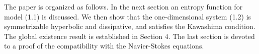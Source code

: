\documentclass{article}
\theoremstyle{plain}
\begin{document}
The paper is organized as follows. In the next section an entropy function for model (1.1) is discussed. We then show that the one-dimensional system (1.2) is symmetrizable hyperbolic and dissipative, and satisfies the Kawashima condition. The global existence result is established in Section 4. The last section is devoted to a proof of the compatibility with the Navier-Stokes equations.

%
%
%
%
\end{document}
